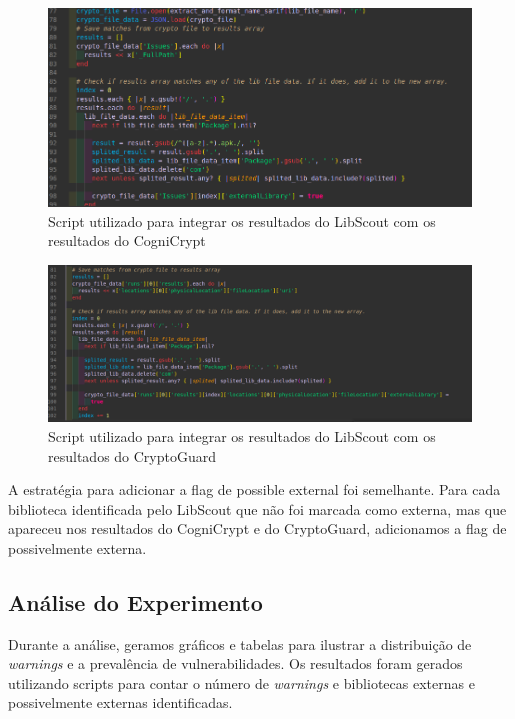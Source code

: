 \begin{figure}[!ht]
  \centering
  \includegraphics[scale=0.4]{img/integration_script_cogni.png}
  \caption{Script utilizado para integrar os resultados do LibScout com os resultados do CogniCrypt}
  \label{img: integration_script}
\end{figure}

\FloatBarrier

\begin{figure}[!ht]
  \centering
  \includegraphics[scale=0.4]{img/integration_script_crypto.png}
  \caption{Script utilizado para integrar os resultados do LibScout com os resultados do CryptoGuard}
  \label{img: integration_script}
\end{figure}

\FloatBarrier

A estratégia para adicionar a flag de possible external foi semelhante. Para cada biblioteca identificada pelo LibScout que não foi marcada como externa, mas que apareceu nos resultados do CogniCrypt e do CryptoGuard, adicionamos a flag de possivelmente externa.


\subsection{Análise do Experimento} Durante a análise, geramos gráficos e tabelas para ilustrar a distribuição de \textit{warnings} e a prevalência de vulnerabilidades. Os resultados foram gerados utilizando scripts para contar o número de \textit{warnings} e bibliotecas externas e possivelmente externas identificadas.


